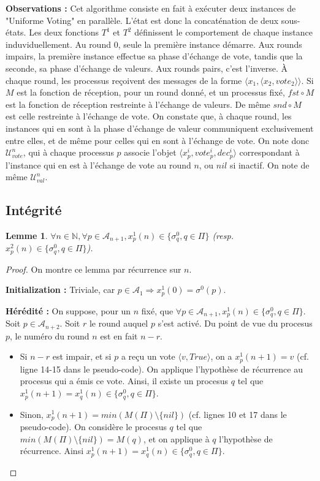 \documentclass{article}
\newtheorem{lemma}{Lemme}
\begin{document}
\textbf{Observations :} Cet algorithme consiste en fait à exécuter deux instances de "Uniforme Voting" en parallèle.
L'état est donc la concaténation de deux sous-états.
Les deux fonctions $T^1$ et $T^2$ définissent le comportement de chaque instance induviduellement.
Au round $0$, seule la première instance démarre.
Aux rounds impairs, la première instance effectue sa phase d'échange de vote, tandis que la seconde, sa phase d'échange de valeurs.
Aux rounds pairs, c'est l'inverse.
À chaque round, les processus reçoivent des messages de la forme $\langle x_1 , \langle x_2, vote_2 \rangle \rangle$.
Si $M$ est la fonction de réception, pour un round donné, et un processus fixé, $fst \circ M$ est la fonction de réception restreinte à l'échange de valeurs.
De même $snd \circ M$ est celle restreinte à l'échange de vote.
On constate que, à chaque round, les instances qui en sont à la phase d'échange de valeur communiquent exclusivement entre elles, et de même pour celles qui en sont à l'échange de vote.
On note donc $\mathcal{U}_{vote}^n$, qui à chaque processus $p$ associe l'objet $\langle x^i_p, vote^i_p, dec^i_p \rangle$
correspondant à l'instance qui en est à l'échange de vote au round $n$, ou $nil$ si inactif. On note de même $\mathcal{U}_{val}^n$.

\subsection{Intégrité}
\begin{lemma}
	$\forall n \in \mathds{N}, \forall p \in \mathcal{A}_{n+1},  x^1_p(n) \in \{\sigma^0_q, q \in \Pi\}$ (resp. $x^2_p(n) \in \{\sigma^0_q, q \in \Pi\}$).
\end{lemma}
\begin{proof}

	On montre ce lemma par récurrence sur $n$.

	\textbf{Initialization :} Triviale, car $p \in \mathcal{A}_1 \Rightarrow x^1_p(0) = \sigma^0(p)$.

	\textbf{Hérédité :} On suppose, pour un $n$ fixé, que $\forall p \in \mathcal{A}_{n+1},  x^1_p(n) \in \{\sigma^0_q, q \in \Pi\}$.
	Soit $p \in \mathcal{A}_{n+2}$. Soit $r$ le round auquel $p$ s'est activé. Du point de vue du procesus $p$, le numéro du round $n$ est en fait $n-r$.
	\begin{itemize}

		\item Si $n-r$ est impair, et si $p$ a reçu un vote $\langle v, True \rangle$, on a $x^1_p(n+1) = v$ (cf. ligne 14-15 dans le pseudo-code).
			On applique l'hypothèse de récurrence au procesus qui a émis ce vote.
			Ainsi, il existe un procesus $q$ tel que  $x^1_p(n+1) = x^1_q(n) \in \{\sigma^0_q, q \in \Pi\}$.
		\item Sinon, $x^1_p(n+1) = min (M(\Pi) \setminus \{nil\})$ (cf. lignes 10 et 17 dans le pseudo-code).
			On considère le procesus $q$ tel que $min (M(\Pi) \setminus \{nil\}) = M(q)$,
			et on applique à $q$ l'hypothèse de récurrence. Ainsi $x^1_p(n+1) = x^1_q(n) \in \{\sigma^0_q, q \in \Pi\}$.

	\end{itemize}
\end{proof}
\end{document}
